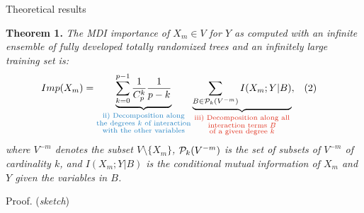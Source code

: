 \documentclass[final]{beamer}
\begin{document}
\begin{frame}{}
\begin{textblock}{0.32}
\begin{block}{Theoretical results \phantom{p}}
\begin{shaded}
\textbf{Theorem 1.}
\textit{The MDI importance of $X_m \in V$ for $Y$ as computed
with an   infinite ensemble of fully developed totally randomized trees and an
infinitely large training set is:}
  \begin{align*}
  Imp(X_m)&=\underbrace{\sum_{k=0}^{p-1} \frac{1}{C_p^k} \frac{1}{p-k}}_{{\color{lightblue} \substack{\text{ii) Decomposition along}\\
                                                                                                     \text{the degrees $k$ of interaction}\\
                                                                                                     \text{with the other variables}}}}
           \underbrace{\sum_{B \in {\cal P}_k(V^{-m})} I(X_m;Y|B)}_{{\color{lightred} \substack{\text{iii) Decomposition along all}\\
                                                                                                \text{interaction terms $B$}\\
                                                                                                \text{of a given degree $k$}}}}, &&\text{(2)}
  \end{align*}
\textit{\noindent where $V^{-m}$ denotes the subset $V \setminus \{X_m\}$, ${\cal
P}_k(V^{-m})$ is the set of subsets of  $V^{-m}$ of cardinality $k$, and
$I(X_m;Y|B)$ is the conditional mutual information of $X_{m}$ and $Y$ given the
variables in $B$.}
\end{shaded}

Proof. (\textit{sketch})


\end{block}
\end{textblock}
\end{frame}
\end{document}
